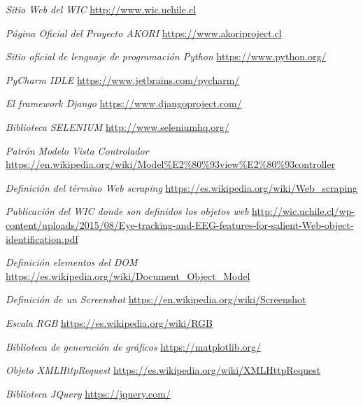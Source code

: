 \newpage %
\begin{references}
	\textit{Sitio Web del WIC}
	\url{http://www.wic.uchile.cl}
	
	\textit{Página Oficial del Proyecto AKORI} 
	\url{https://www.akoriproject.cl}
	
	\textit{Sitio oficial de lenguaje de programación \textit{Python}}
	\url{https://www.python.org/}
	
	\textit{PyCharm IDLE}
	\url{https://www.jetbrains.com/pycharm/}
	
	\textit{El framework \textit{Django}}
	\url{https://www.djangoproject.com/}
	
	\textit{Biblioteca SELENIUM}
	\url{http://www.seleniumhq.org/}
	
	\textit{Patrón Modelo Vista Controlador}
	\url{https://en.wikipedia.org/wiki/Model%E2%80%93view%E2%80%93controller}
	
	\textit{Definición del término Web scraping}
	\url{https://es.wikipedia.org/wiki/Web_scraping}
	
	\textit{Publicación del WIC donde son definidos los objetos web}
	\url{http://wic.uchile.cl/wp-content/uploads/2015/08/Eye-tracking-and-EEG-features-for-salient-Web-object-identification.pdf}
	
	\textit{Definición elementos del DOM}
	\url{https://es.wikipedia.org/wiki/Document_Object_Model}
	
	\textit{Definición de un Screenshot}
	\url{https://en.wikipedia.org/wiki/Screenshot}
	
	\textit{Escala RGB}
	\url{https://es.wikipedia.org/wiki/RGB}
	
	\textit{Biblioteca de generación de gráficos}
	\url{https://matplotlib.org/}
	
	\textit{Objeto XMLHttpRequest}
	\url{https://es.wikipedia.org/wiki/XMLHttpRequest}
	
	\textit{Biblioteca JQuery}
	\url{https://jquery.com/}
	
	
	

\end{references}
